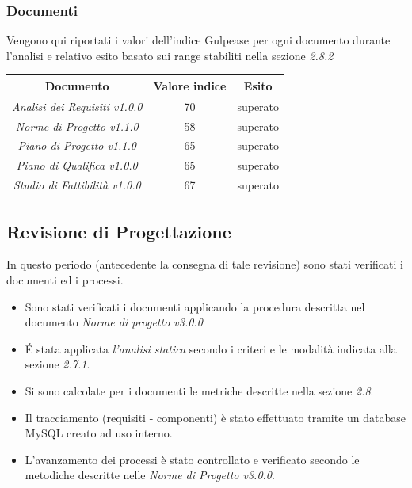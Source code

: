 {  \subsubsection{Documenti}
  Vengono qui riportati i valori dell'indice Gulpease per ogni documento durante l’analisi e relativo
  esito basato sui range stabiliti nella sezione \emph{2.8.2}
  \begin{center}
    \begin{tabular}{|c|c|c|}
      \hline
      \textbf{Documento} & \textbf{Valore indice} & \textbf{Esito} \\
      \hline
      \emph{Analisi dei Requisiti v1.0.0}  & 70 & superato \\
      \hline
      \emph{Norme di Progetto v1.1.0}   & 58  & superato \\
      \hline
      \emph{Piano di Progetto v1.1.0}   & 65 & superato \\
      \hline
      \emph{Piano di Qualifica v1.0.0}   & 65 & superato \\
      \hline
      \emph{Studio di Fattibilità v1.0.0}  & 67 & superato \\
      \hline
    \end{tabular}
  \end{center}



  \subsection{Revisione di Progettazione}
  In questo periodo (antecedente la consegna di tale revisione) sono stati verificati i documenti ed i processi.

  \begin{itemize}
  \item Sono stati verificati i documenti applicando la procedura descritta nel documento \emph{Norme di progetto v3.0.0}
  \item \'E stata applicata \emph{l'analisi statica} secondo i criteri e le modalità indicata alla sezione \emph{2.7.1}.
  \item Si sono calcolate per i documenti le metriche descritte nella sezione \emph{2.8}.
  \item Il tracciamento (requisiti - componenti) è stato effettuato tramite un database MySQL creato ad uso interno.
  \item L'avanzamento dei processi è stato controllato e verificato secondo le metodiche descritte nelle \emph{Norme di Progetto v3.0.0}.


\end{itemize}}
